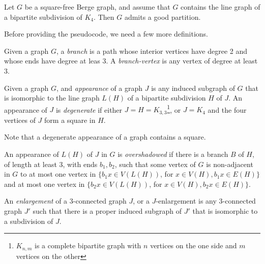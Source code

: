 \begin{theorem}
  Let $G$ be a square-free Berge graph, and assume that $G$ contains the line graph of a bipartite subdivision of $K_4$. Then $G$ admits a good partition.
\end{theorem}

Before providing the pseudocode, we need a few more definitions.

\begin{defnTwo}[branch]
  Given a graph $G$, a \emph{branch} is a path whose interior vertices have degree 2 and whose ends have degree at leas 3. A \emph{branch-vertex} is any vertex of degree at least 3.
\end{defnTwo}

\begin{defnTwo}
  Given a graph $G$, and \emph{appearance} of a graph $J$ is any induced subgraph of $G$ that is isomorphic to the line graph $L(H)$ of a bipartite subdivision $H$ of $J$. An appearance of $J$ is \emph{degenerate} if either $J = H = K_{3, 3}$\footnote{$K_{n, m}$ is a complete bipartite graph with $n$ vertices on the one side and $m$ vertices on the other}, or $J = K_4$ and the four vertices of $J$ form a square in $H$.
\end{defnTwo}

Note that a degenerate appearance of a graph contains a square.

\begin{defnTwo}
  An appearance of $L(H)$ of $J$ in $G$ is \emph{overshadowed} if there is a branch $B$ of $H$, of length at least 3, with ends $b_1, b_2$, such that some vertex of $G$ is non-adjacent in $G$ to at most one vertex in $\{b_1x \in V(L(H))$, for $x \in V(H), b_1x \in E(H)\}$ and at most one vertex in $\{b_2x \in V(L(H))$, for $x \in V(H), b_2x \in E(H)\}$.
\end{defnTwo}

\begin{defnTwo}[$J$-enlargement]
  An \emph{enlargement} of a 3-connected graph $J$, or a $J$-enlargement is any 3-connected graph $J'$ such that there is a proper induced subgraph of $J'$ that is isomorphic to a subdivision of $J$.
\end{defnTwo}


